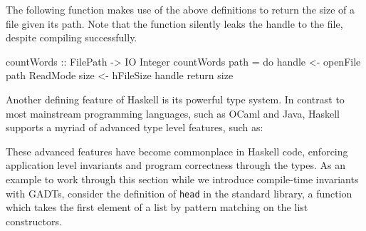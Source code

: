 \documentclass[]{lwnovathesis}
\begin{document}
The following function makes use of the above definitions to return the size of
a file given its path. Note that the function silently leaks the handle to the
file, despite compiling successfully.

\begin{code}
countWords :: FilePath -> IO Integer
countWords path = do
    handle <- openFile path ReadMode
    size   <- hFileSize handle
    return size
\end{code}

Another defining feature of Haskell is its powerful type system. In contrast to
most mainstream programming languages, such as OCaml and Java, Haskell supports a myriad of
advanced type level features, such as:
These advanced features have become commonplace in Haskell code, enforcing
application level invariants and program correctness through the types. As an
example to work through this section while we introduce compile-time invariants
with GADTs, consider the definition of \texttt{head} in the standard library, a
function which takes the first element of a list by pattern matching on the list
constructors.
\end{document}
